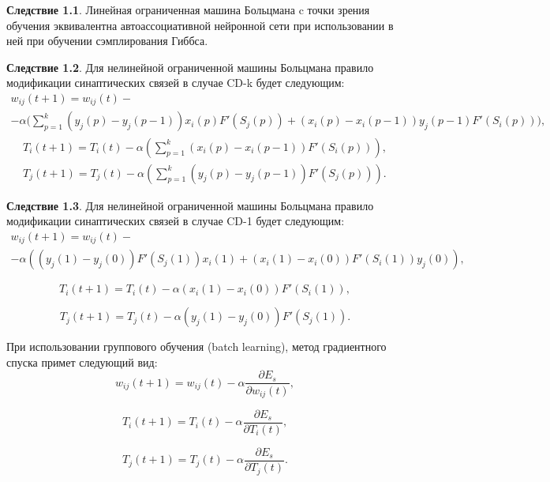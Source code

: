\textbf{Следствие 1.1}. Линейная ограниченная машина Больцмана c точки зрения обучения эквивалентна автоассоциативной нейронной сети при использовании в ней при обучении сэмплирования Гиббса.

\textbf{Следствие 1.2}. Для нелинейной ограниченной машины Больцмана правило модификации синаптических связей в случае CD-k будет следующим:
\begin{multline*}
    w_{ij}(t+1)=w_{ij}(t)-\\-\alpha\Bigg(\sum_{p=1}^k (y_j(p)-y_j(p-1))x_i(p)F'(S_j(p))+(x_i(p)-x_i(p-1))y_j(p-1)F'(S_i(p))\Bigg),
\end{multline*}
\begin{equation*}
\begin{aligned}
    T_i(t+1)=T_i(t)-\alpha\left(\sum_{p=1}^k (x_i(p)-x_i(p-1))F'(S_i(p))\right),\\
    T_j(t+1)=T_j(t)-\alpha\left(\sum_{p=1}^k (y_j(p)-y_j(p-1))F'(S_j(p))\right).
\end{aligned}
\end{equation*}

\textbf{Следствие 1.3}. Для нелинейной ограниченной машины Больцмана правило модификации синаптических связей в случае CD-1 будет следующим:	
\begin{multline*}
    w_{ij}(t+1)=w_{ij}(t)-\\-\alpha((y_j(1)-y_j(0))F'(S_j(1))x_i(1)+(x_i(1)-x_i(0))F'(S_i(1))y_j(0)),
\end{multline*}

\begin{equation*}
    T_i(t+1)=T_i(t)-\alpha(x_i(1)-x_i(0))F'(S_i(1)),
\end{equation*}

\begin{equation*}
    T_j(t+1)=T_j(t)-\alpha(y_j(1)-y_j(0))F'(S_j(1)).  
\end{equation*}

При использовании группового обучения (batch learning), метод градиентного спуска примет следующий вид:
\begin{equation}
    w_{ij}(t+1)=w_{ij}(t)-\alpha\frac{\partial E_s}{\partial w_{ij}(t)},
\end{equation}

\begin{equation}
    T_{i}(t+1)=T_{i}(t)-\alpha\frac{\partial E_s}{\partial T_{i}(t)},
\end{equation}

\begin{equation}
    T_{j}(t+1)=T_{j}(t)-\alpha\frac{\partial E_s}{\partial T_{j}(t)}.
\end{equation}

